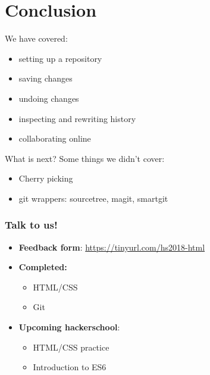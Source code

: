 \documentclass[12pt]{beamer}
\begin{document}
\section{Conclusion}
\begin{frame}
We have covered:
\begin{itemize}
	\item setting up a repository
	\item saving changes
	\item undoing changes
	\item inspecting and rewriting history
	\item collaborating online
\end{itemize}
\end{frame}

\begin{frame}{What is next?}
Some things we didn't cover:
\begin{itemize}
\item Cherry picking
\item git wrappers: sourcetree, magit, smartgit
\end{itemize}
\end{frame}


\begin{frame}
\frametitle{Talk to us!}
\begin{itemize}
	\item \textbf{Feedback form}: \url{https://tinyurl.com/hs2018-html}
	\item \textbf{Completed:}
	\begin{itemize}
		\item HTML/CSS
		\item Git
	\end{itemize}
	\item \textbf{Upcoming hackerschool}:
	\begin{itemize}
		\item HTML/CSS practice
		\item Introduction to ES6
	\end{itemize}
\end{itemize}
\end{frame}
\end{document}
